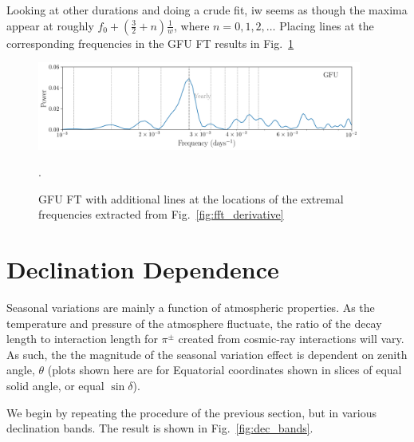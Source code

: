Looking at other durations and doing a crude fit, iw seems as though the maxima appear at roughly $f_0 + (\frac{3}{2} + n)\frac{1}{w}$, where $n = 0,1,2,\ldots$
Placing lines at the corresponding frequencies in the GFU FT results in Fig.~\ref{fig:gfu_with_harmonics}

\begin{figure}
    \centering
    \includegraphics[width=0.95\textwidth]{images/gfu_online_overall_FFT_maxima_True.png}
    \caption{GFU FT with additional lines at the locations of the extremal frequencies extracted from Fig.~\ref{fig:fft_derivative}}.
    \label{fig:gfu_with_harmonics}
\end{figure}

\section{Declination Dependence}
Seasonal variations are mainly a function of atmospheric properties. As the temperature and pressure of the atmosphere fluctuate, the ratio of the decay length to interaction length for $\pi^{\pm}$ created from cosmic-ray interactions will vary. As such, the the magnitude of the seasonal variation effect is dependent on zenith angle, $\theta$ (plots shown here are for Equatorial coordinates shown in slices of equal solid angle, or equal $\sin \delta$). 

We begin by repeating the procedure of the previous section, but in various declination bands. The result is shown in Fig.~\ref{fig:dec_bands}.

